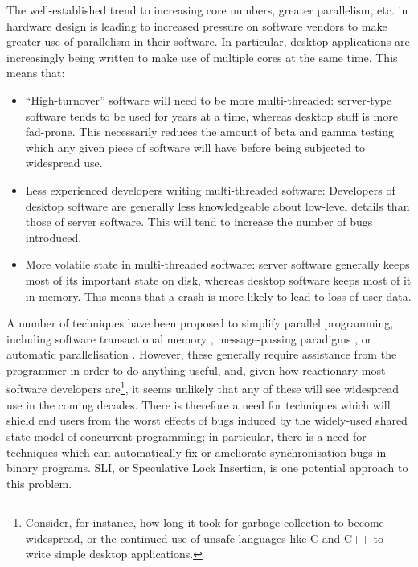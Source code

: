 \documentclass[10pt,a4paper]{report}
\begin{document}
The well-established trend to increasing core numbers, greater
parallelism, etc. in hardware design is leading to increased pressure
on software vendors to make greater use of parallelism in their
software.  In particular, desktop applications are increasingly being
written to make use of multiple cores at the same time.  This
means that:

\begin{itemize}
\item ``High-turnover'' software will need to be more multi-threaded:
  server-type software tends to be used for years at a time, whereas
  desktop stuff is more fad-prone.  This necessarily reduces the
  amount of beta and gamma testing which any given piece of software
  will have before being subjected to widespread use.

\item Less experienced developers writing multi-threaded software:
  Developers of desktop software are generally less knowledgeable
  about low-level details than those of server
  software.  This will tend to increase the
  number of bugs introduced.

\item More volatile state in multi-threaded software: server software
  generally keeps most of its important state on disk, whereas desktop
  software keeps most of it in memory.  This means that a crash is
  more likely to lead to loss of user data.
\end{itemize}

A number of techniques have been proposed to simplify parallel
programming, including software transactional memory \needCite{},
message-passing paradigms \needCite{}, or automatic parallelisation
\needCite{}.  However, these generally require assistance from the
programmer in order to do anything useful, and, given how reactionary
most software developers are\footnote{Consider, for instance, how long
  it took for garbage collection to become widespread, or the
  continued use of unsafe languages like C and C++ to write simple
  desktop applications.}, it seems unlikely that any of these will see
widespread use in the coming decades.  There
is therefore a need for techniques which will shield end users from
the worst effects of bugs induced by the widely-used shared state
model of concurrent programming; in particular, there is a need for
techniques which can automatically fix or ameliorate synchronisation
bugs in binary programs.  SLI, or Speculative Lock Insertion, is one
potential approach to this problem.
\end{document}
